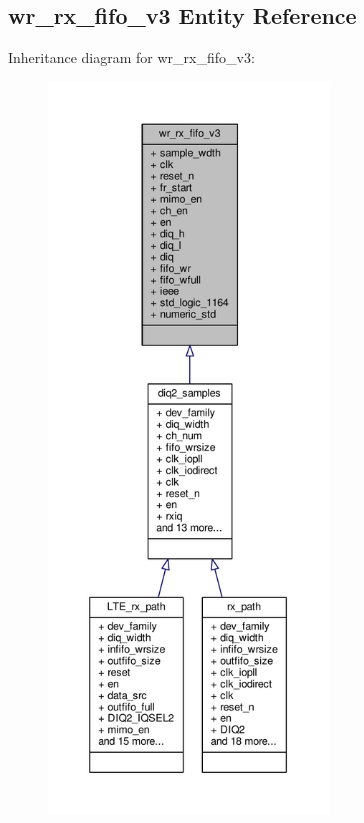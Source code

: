 \subsection{wr\+\_\+rx\+\_\+fifo\+\_\+v3 Entity Reference}
\label{classwr__rx__fifo__v3}


Inheritance diagram for wr\+\_\+rx\+\_\+fifo\+\_\+v3\+:\nopagebreak
\begin{figure}[H]
\begin{center}
\leavevmode
\includegraphics[height=550pt]{dd/d99/classwr__rx__fifo__v3__inherit__graph}
\end{center}
\end{figure}


